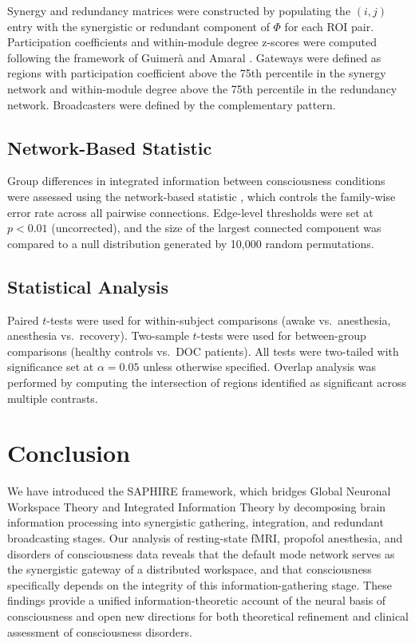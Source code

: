 \documentclass[11pt]{article}
\begin{document}
Synergy and redundancy matrices were constructed by populating the $(i,j)$ entry with the synergistic or redundant component of $\Phi$ for each ROI pair. Participation coefficients and within-module degree z-scores were computed following the framework of Guimer\`{a} and Amaral \citep{guimera2005functional}. Gateways were defined as regions with participation coefficient above the 75th percentile in the synergy network and within-module degree above the 75th percentile in the redundancy network. Broadcasters were defined by the complementary pattern.

\subsection{Network-Based Statistic}

Group differences in integrated information between consciousness conditions were assessed using the network-based statistic \citep{zalesky2010network}, which controls the family-wise error rate across all pairwise connections. Edge-level thresholds were set at $p < 0.01$ (uncorrected), and the size of the largest connected component was compared to a null distribution generated by 10,000 random permutations.

\subsection{Statistical Analysis}

Paired $t$-tests were used for within-subject comparisons (awake vs.\ anesthesia, anesthesia vs.\ recovery). Two-sample $t$-tests were used for between-group comparisons (healthy controls vs.\ DOC patients). All tests were two-tailed with significance set at $\alpha = 0.05$ unless otherwise specified. Overlap analysis was performed by computing the intersection of regions identified as significant across multiple contrasts.

\section{Conclusion}

We have introduced the SAPHIRE framework, which bridges Global Neuronal Workspace Theory and Integrated Information Theory by decomposing brain information processing into synergistic gathering, integration, and redundant broadcasting stages. Our analysis of resting-state fMRI, propofol anesthesia, and disorders of consciousness data reveals that the default mode network serves as the synergistic gateway of a distributed workspace, and that consciousness specifically depends on the integrity of this information-gathering stage. These findings provide a unified information-theoretic account of the neural basis of consciousness and open new directions for both theoretical refinement and clinical assessment of consciousness disorders.



\end{document}
